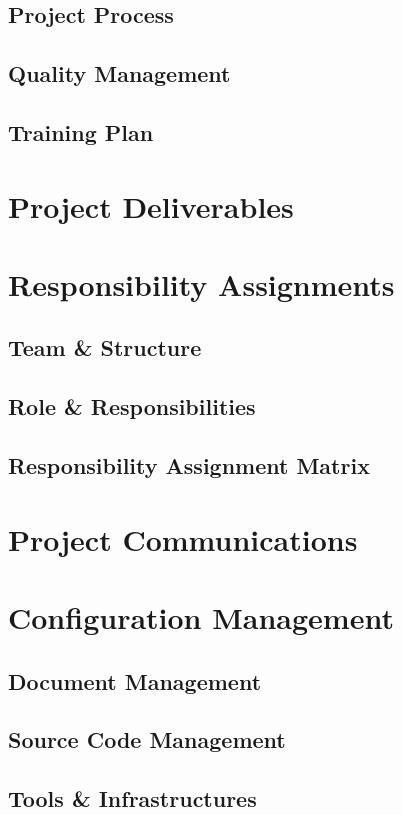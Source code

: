 \documentclass[12pt,a4paper]{article}
\begin{document}
    \subsection{Project Process}
    

    \subsection{Quality Management}
    

    \subsection{Training Plan}
    

\section{Project Deliverables}
    

\section{Responsibility Assignments}
    

    \subsection{Team \& Structure}
    

    \subsection{Role \& Responsibilities}
    

    \subsection{Responsibility Assignment Matrix}
    

\section{Project Communications}
    

\section{Configuration Management}
    \subsection{Document Management}
    

    \subsection{Source Code Management}
    

    \subsection{Tools \& Infrastructures}
    


\end{document}

